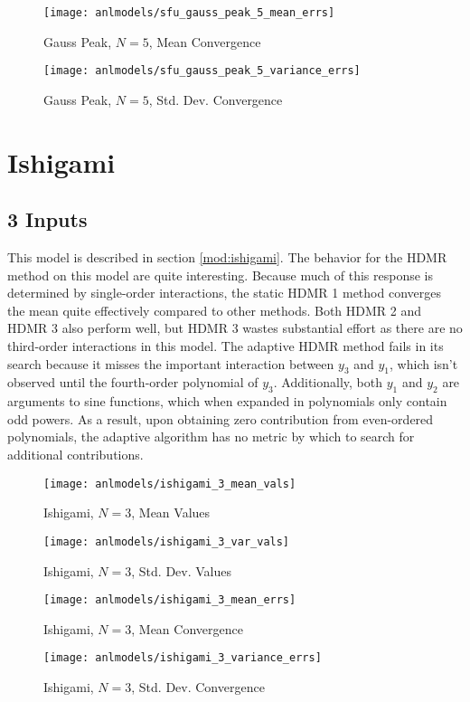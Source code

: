 \begin{figure}[H]
  \centering
  \texttt{[image: anlmodels/sfu\_gauss\_peak\_5\_mean\_errs]}
  \caption{Gauss Peak, $N=5$, Mean Convergence}
  \label{fig:gauss peak mean errors 5}
\end{figure}
\begin{figure}[H]
  \centering
  \texttt{[image: anlmodels/sfu\_gauss\_peak\_5\_variance\_errs]}
  \caption{Gauss Peak, $N=5$, Std. Dev. Convergence}
  \label{fig:gauss peak var errors 5}
\end{figure}




\section{Ishigami}
\subsection{3 Inputs}
This model is described in section \ref{mod:ishigami}.
The behavior for the HDMR method on this model are quite interesting.  Because much of this response is
determined by single-order interactions, the static HDMR 1 method converges the mean quite effectively
compared to other methods.  Both HDMR 2 and HDMR 3 also perform well, but HDMR 3 wastes substantial effort as
there are no third-order interactions in this model.  The adaptive HDMR method fails in its search because it
misses the important interaction between $y_3$ and $y_1$, which isn't observed until the fourth-order
polynomial of $y_3$.  Additionally, both $y_1$ and $y_2$ are arguments to sine functions, which when expanded
in polynomials only contain odd powers.  As a result, upon obtaining zero contribution from even-ordered
polynomials, the adaptive algorithm has no metric by which to search for additional contributions.
\begin{figure}[H]
  \centering
  \texttt{[image: anlmodels/ishigami\_3\_mean\_vals]}
  \caption{Ishigami, $N=3$, Mean Values}
  \label{fig:ishigami mean values 3}
\end{figure}
\begin{figure}[H]
  \centering
  \texttt{[image: anlmodels/ishigami\_3\_var\_vals]}
  \caption{Ishigami, $N=3$, Std. Dev. Values}
  \label{fig:ishigami var values 3}
\end{figure}

\begin{figure}[H]
  \centering
  \texttt{[image: anlmodels/ishigami\_3\_mean\_errs]}
  \caption{Ishigami, $N=3$, Mean Convergence}
  \label{fig:ishigami mean errors 3}
\end{figure}
\begin{figure}[H]
  \centering
  \texttt{[image: anlmodels/ishigami\_3\_variance\_errs]}
  \caption{Ishigami, $N=3$, Std. Dev. Convergence}
  \label{fig:ishigami var errors 3}
\end{figure}


